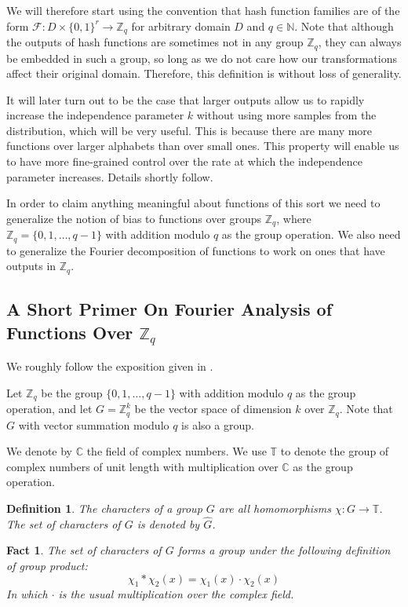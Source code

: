 \documentclass[12pt]{article}
\newtheorem{definition}{Definition}[section]
\newtheorem{fact}[theorem]{Fact}
\newcommand{\zo}[1]{\{0,1\}^{#1}}
\newcommand{\C}{\mathbb{C}}
\newcommand{\F}{\mathcal{F}}
\renewcommand{\T}{\mathbb{T}}
\newcommand{\Z}{\mathbb{Z}}
\begin{document}
	We will therefore start using the convention that hash function families are of the form $\F: D \times \zo{r} \rightarrow \Z_q$ for arbitrary domain $D$ and $q \in \mathbb{N}$.
	Note that although the outputs of hash functions are sometimes not in any group $\Z_q$, they can always be embedded in such a group, so long as we do not care how our transformations affect their original domain.
	Therefore, this definition is without loss of generality.
	
	It will later turn out to be the case that larger outputs allow us to rapidly increase the independence parameter $k$ without using more samples from the distribution, which will be very useful.
	This is because there are many more functions over larger alphabets than over small ones.
	This property will enable us to have more fine-grained control over the rate at which the independence parameter increases.
	Details shortly follow.
	
	In order to claim anything meaningful about functions of this sort we need to generalize the notion of bias to functions over groups $\Z_q$, where $\Z_q = \{0, 1, \dots, q-1\}$ with addition modulo $q$ as the group operation.
	We also need to generalize the Fourier decomposition of functions to work on ones that have outputs in $\Z_q$.
	
	\subsection{A Short Primer On Fourier Analysis of Functions Over $\Z_q$}
	
	We roughly follow the exposition given in \cite{BabaiFourierNotes}.
	
	Let $\Z_q$ be the group $\{0, 1, \dots, q-1\}$ with addition modulo $q$ as the group operation, and let $G = \Z_q^k$ be the vector space of dimension $k$ over $\Z_q$.
	Note that $G$ with vector summation modulo $q$ is also a group.
	
	We denote by $\C$ the field of complex numbers.
	We use $\T$ to denote the group of complex numbers of unit length with multiplication over $\C$ as the group operation.
	\begin{definition}
		The \emph{characters} of a group $G$ are all homomorphisms $\chi : G \rightarrow \T$.
		The set of characters of $G$ is denoted by $\hat{G}$.
	\end{definition}
	
	\begin{fact}
		The set of characters of $G$ forms a group under the following definition of group product:
		\begin{equation*}
			\chi_1 \ast \chi_2(x) = \chi_1(x) \cdot \chi_2(x)
		\end{equation*}
		In which $\cdot$ is the usual multiplication over the complex field.
	\end{fact}
	
\end{document}
